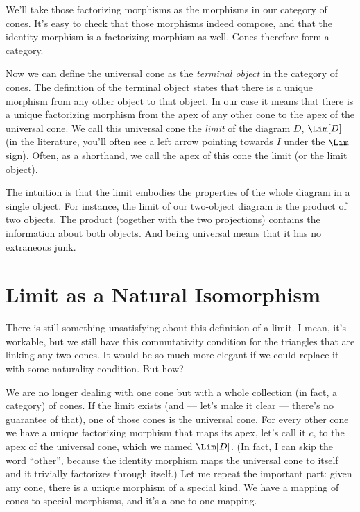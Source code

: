 \noindent
We'll take those factorizing morphisms as the morphisms in our category
of cones. It's easy to check that those morphisms indeed compose, and
that the identity morphism is a factorizing morphism as well. Cones
therefore form a category.

Now we can define the universal cone as the \emph{terminal object} in
the category of cones. The definition of the terminal object states that
there is a unique morphism from any other object to that object. In our
case it means that there is a unique factorizing morphism from the apex
of any other cone to the apex of the universal cone. We call this
universal cone the \emph{limit} of the diagram $D$, $\Lim[D]$ (in
the literature, you'll often see a left arrow pointing towards $I$
under the $\Lim$ sign). Often, as a shorthand, we call the apex of
this cone the limit (or the limit object).

The intuition is that the limit embodies the properties of the whole
diagram in a single object. For instance, the limit of our two-object
diagram is the product of two objects. The product (together with the
two projections) contains the information about both objects. And being
universal means that it has no extraneous junk.

\section{Limit as a Natural Isomorphism}

There is still something unsatisfying about this definition of a limit.
I mean, it's workable, but we still have this commutativity condition
for the triangles that are linking any two cones. It would be so much
more elegant if we could replace it with some naturality condition. But
how?

We are no longer dealing with one cone but with a whole collection (in
fact, a category) of cones. If the limit exists (and --- let's make it
clear --- there's no guarantee of that), one of those cones is the
universal cone. For every other cone we have a unique factorizing
morphism that maps its apex, let's call it $c$, to the apex of
the universal cone, which we named $\Lim[D]$. (In fact, I can skip
the word ``other'', because the identity morphism maps the universal
cone to itself and it trivially factorizes through itself.) Let me
repeat the important part: given any cone, there is a unique morphism of
a special kind. We have a mapping of cones to special morphisms, and
it's a one-to-one mapping.

